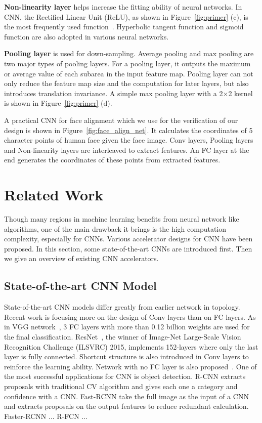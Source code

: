 \documentclass[10pt, conference, compsocconf]{IEEEtran}
\begin{document}
\textbf{Non-linearity layer} helps increase the fitting ability of neural networks. In CNN, the Rectified Linear Unit (ReLU), as shown in Figure~\ref{fig:primer} (c), is the most frequently used function~\cite{krizhevsky2012imagenet}. Hyperbolic tangent function and sigmoid function are also adopted in various neural networks.

\textbf{Pooling layer} is used for down-sampling. Average pooling and max pooling are two major types of pooling layers. For a pooling layer, it outputs the maximum or average value of each subarea in the input feature map. Pooling layer can not only reduce the feature map size and the computation for later layers, but also introduces translation invariance. A simple max pooling layer with a 2$\times$2 kernel is shown in Figure~\ref{fig:primer} (d).

A practical CNN for face alignment which we use for the verification of our design is shown in Figure~\ref{fig:face_align_net}. It calculates the coordinates of 5 character points of human face given the face image. Conv layers, Pooling layers and Non-linearity layers are interleaved to extract features. An FC layer at the end generates the coordinates of these points from extracted features.

\section{Related Work} \label{sec:related_work}
Though many regions in machine learning benefits from neural network like algorithms, one of the main drawback it brings is the high computation complexity, especially for CNNs. Various accelerator designs for CNN have been proposed. In this section, some state-of-the-art CNNs are introduced first. Then we give an overview of existing CNN accelerators.

\subsection{State-of-the-art CNN Model}
State-of-the-art CNN models differ greatly from earlier network in topology. Recent work is focusing more on the design of Conv layers than on FC layers. As in VGG network~\cite{simonyan2014very}, 3 FC layers with more than 0.12 billion weights are used for the final classification. ResNet~\cite{he2015deep}, the winner of Image-Net Large-Scale Vision Recognition Challenge (ILSVRC) 2015, implements 152-layers where only the last layer is fully connected. Shortcut structure is also introduced in Conv layers to reinforce the learning ability. Network with no FC layer is also proposed~\cite{long2015fully}.
One of the most successful applications for CNN is object detection. R-CNN extracts proposals with traditional CV algorithm and gives each one a category and confidence with a CNN. Fast-RCNN take the full image as the input of a CNN and extracts proposals on the output features to reduce redundant calculation. Faster-RCNN ... R-FCN ... 
\end{document}
